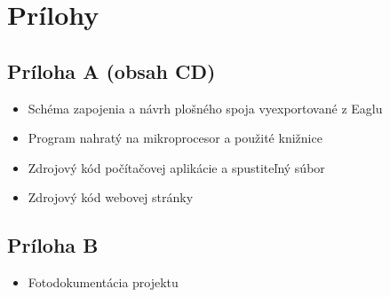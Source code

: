 \documentclass[titlepage,12pt]{article}
\begin{document}
\newpage
\section{Prílohy}
\subsection*{Príloha A (obsah CD)}
\begin{itemize}
	\item Schéma zapojenia a návrh plošného spoja vyexportované z Eaglu
	\item Program nahratý na mikroprocesor a použité knižnice
	\item Zdrojový kód počítačovej aplikácie a spustiteľný súbor
	\item Zdrojový kód webovej stránky
\end{itemize}
\subsection*{Príloha B}
\begin{itemize}
	\item Fotodokumentácia projektu
\end{itemize}
\end{document}
